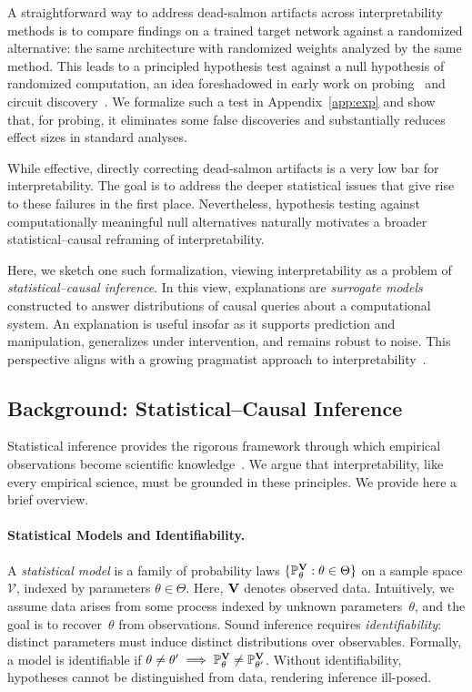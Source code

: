 A straightforward way to address dead-salmon artifacts across interpretability methods is to compare findings on a trained target network against a randomized alternative: the same architecture with randomized weights analyzed by the same method. This leads to a principled hypothesis test against a null hypothesis of randomized computation, an idea foreshadowed in early work on probing~\citep{conneau-etal-2018-cram,hewitt-manning-2019-structural,ravichander-etal-2021-probing} and circuit discovery~\citep{shi2024hypothesistestingcircuithypothesis}. We formalize such a test in Appendix~\ref{app:exp} and show that, for probing, it eliminates some false discoveries and substantially reduces effect sizes in standard analyses.

While effective, directly correcting dead-salmon artifacts is a very low bar for interpretability. The goal is to address the deeper statistical issues that give rise to these failures in the first place. Nevertheless, hypothesis testing against computationally meaningful null alternatives naturally motivates a broader statistical–causal reframing of interpretability.

Here, we sketch one such formalization, viewing interpretability as a problem of \emph{statistical–causal inference}. In this view, explanations are \emph{surrogate models} constructed to answer distributions of causal queries about a computational system. An explanation is useful insofar as it supports prediction and manipulation, generalizes under intervention, and remains robust to noise. This perspective aligns with a growing pragmatist approach to interpretability~\citep{P_ez_2019}.

\subsection{Background: Statistical--Causal Inference}

Statistical inference provides the rigorous framework through which empirical observations become scientific knowledge~\citep{cox2006principles,lehmann1998theory}. We argue that interpretability, like every empirical science, must be grounded in these principles. We provide here a brief overview.

\paragraph{Statistical Models and Identifiability.}
A \emph{statistical model} is a family of probability laws $\{\mathbb{P}_\theta^{\mathbf{V}}:\theta\in\Theta\}$ on a sample space $\mathcal{V}$, indexed by parameters $\theta\in\Theta$. Here, $\mathbf{V}$ denotes observed data. Intuitively, we assume data arises from some process indexed by unknown parameters~$\theta$, and the goal is to recover~$\theta$ from observations.
% 
Sound inference requires \emph{identifiability}: distinct parameters must induce distinct distributions over observables. Formally, a model is identifiable if $\theta \neq \theta' \implies \mathbb{P}_\theta^{\mathbf{V}} \neq \mathbb{P}_{\theta'}^{\mathbf{V}}$. Without identifiability, hypotheses cannot be distinguished from data, rendering inference ill-posed. 

